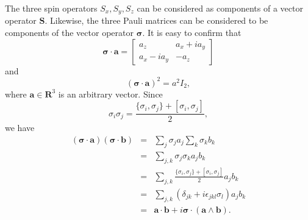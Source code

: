 \documentclass{article}
\numberwithin{equation}{section}
\let\vec\bm
\begin{document}
The three spin operators $S_x, S_y, S_z$ can be considered as components of
a vector operator $\vec{S}$. Likewise, the three Pauli matrices can be 
considered to be components of the vector operator $\vec{\sigma}$. It is
easy to confirm that
\begin{equation}\label{s5e12}
\vec{\sigma}\cdot\vec{a} = \begin{bmatrix}a_z & a_x + ia_y \\ a_x -ia_y & -a_z
\end{bmatrix}
\end{equation}
and
\begin{equation}\label{s5e13}
(\vec{\sigma}\cdot\vec{a})^2 = a^2 I_2,
\end{equation}
where $\vec{a} \in \mathbf{R}^3$ is an arbitrary vector. Since
\begin{equation}\label{s5e14}
\sigma_i\sigma_j = \frac{\{\sigma_i, \sigma_j\} + [\sigma_i, \sigma_j]}{2},
\end{equation}
we have
\begin{eqnarray}
(\vec{\sigma}\cdot\vec{a})(\vec{\sigma}\cdot\vec{b}) &=&
\sum_j \sigma_j a_j \sum_k \sigma_k b_k \nonumber \\
 &=& \sum_{j,k} \sigma_j\sigma_k a_j b_k \nonumber \\
 &=& \sum_{j,k}\frac{\{\sigma_i, \sigma_j\} + [\sigma_i, \sigma_j]}{2}a_jb_k
\nonumber \\
 &=& \sum_{j,k}(\delta_{jk} + i\epsilon_{jkl}\sigma_l)a_jb_k \nonumber \\
 &=& \vec{a}\cdot\vec{b} + i\vec{\sigma}\cdot(\vec{a} \wedge \vec{b}) 
\label{s5e15}.
\end{eqnarray}


\end{document}
